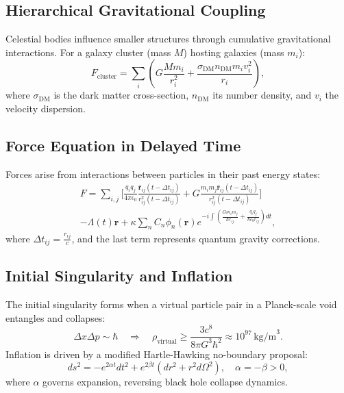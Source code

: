 \documentclass{article}
\begin{document}
\subsection{Hierarchical Gravitational Coupling}
Celestial bodies influence smaller structures through cumulative gravitational interactions. For a galaxy cluster (mass \( M \)) hosting galaxies (mass \( m_i \)):
\begin{equation}
F_{\text{cluster}} = \sum_i \left( G \frac{M m_i}{r_i^2} + \frac{\sigma_{\text{DM}} n_{\text{DM}} m_i v_i^2}{r_i} \right), \label{eq:hierarchy}
\end{equation}
where \( \sigma_{\text{DM}} \) is the dark matter cross-section, \( n_{\text{DM}} \) its number density, and \( v_i \) the velocity dispersion.

\subsection{Force Equation in Delayed Time}
Forces arise from interactions between particles in their past energy states:
\begin{multline}
F = \sum_{i,j} \Bigg[ \frac{q_i q_j}{4\pi \epsilon_0} \frac{\hat{\bm{r}}_{ij}(t - \Delta t_{ij})}{r_{ij}^2(t - \Delta t_{ij})} + G \frac{m_i m_j \hat{\bm{r}}_{ij}(t - \Delta t_{ij})}{r_{ij}^2(t - \Delta t_{ij})} \Bigg] \\
- \Lambda(t) \bm{r} + \kappa \sum_{n} C_n \phi_n(\bm{r}) e^{-i \int \left( \frac{G m_i m_j}{\hbar r_{ij}} + \frac{q_i q_j}{\hbar \epsilon_0 r_{ij}} \right) dt}, \label{eq:force}
\end{multline}
where \( \Delta t_{ij} = \frac{r_{ij}}{c} \), and the last term represents quantum gravity corrections.

\subsection{Initial Singularity and Inflation}
The initial singularity forms when a virtual particle pair in a Planck-scale void entangles and collapses:
\begin{equation}
\Delta x \Delta p \sim \hbar \quad \Rightarrow \quad \rho_{\text{virtual}} \geq \frac{3c^8}{8\pi G^3 \hbar^2} \approx 10^{97} \, \text{kg/m}^3. \label{eq:singularity}
\end{equation}
Inflation is driven by a modified Hartle-Hawking no-boundary proposal:
\begin{equation}
ds^2 = -e^{2\alpha t} dt^2 + e^{2\beta t} \left( dr^2 + r^2 d\Omega^2 \right), \quad \alpha = -\beta > 0, \label{eq:metric}
\end{equation}
where \( \alpha \) governs expansion, reversing black hole collapse dynamics.
\end{document}
